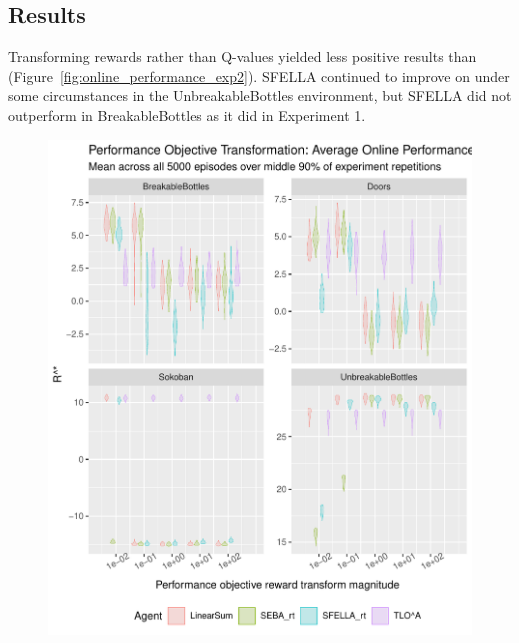 \subsection{Results}

Transforming rewards rather than Q-values yielded less positive results than \tloA{} (Figure~\ref{fig:online_performance_exp2}). SFELLA continued to improve on \tloA{} under some circumstances in the UnbreakableBottles environment, but SFELLA did not outperform \tloA{} in BreakableBottles as it did in Experiment 1. 

\begin{figure}
  \includegraphics[width=\columnwidth]{output/multirun_n100_reward_to_util_transformonline_util_transform_Performance.pdf}

\end{figure}
